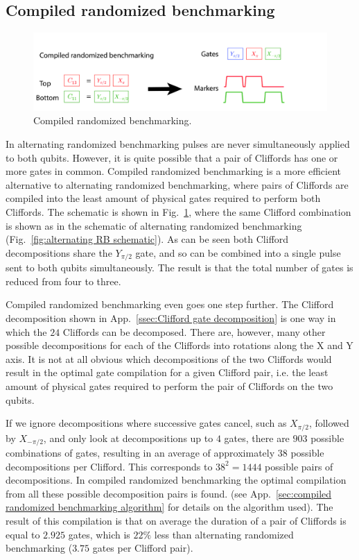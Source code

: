       \subsection{Compiled randomized benchmarking}
        \label{ssec:compiled randomized benchmarking}

        \begin{figure}[!h]
          \centering
          \includegraphics[width=\textwidth]{Figures/Randomized benchmarking/compiled RB.jpg}
          \caption{Compiled randomized benchmarking.}
          \label{fig:compiled RB schematic}
        \end{figure}

        In alternating randomized benchmarking pulses are never simultaneously applied to both qubits. However, it is quite possible that a pair of Cliffords has one or more gates in common. Compiled randomized benchmarking is a more efficient alternative to alternating randomized benchmarking, where pairs of Cliffords are compiled into the least amount of physical gates required to perform both Cliffords. The schematic is shown in Fig.~\ref{fig:compiled RB schematic}, where the same Clifford combination is shown as in the schematic of alternating randomized benchmarking (Fig.~\ref{fig:alternating RB schematic}). As can be seen both Clifford decompositions share the $Y_{\pi/2}$ gate, and so can be combined into a single pulse sent to both qubits simultaneously. The result is that the total number of gates is reduced from four to three.

        Compiled randomized benchmarking even goes one step further. The Clifford decomposition shown in App.~\ref{ssec:Clifford gate decomposition} is one way in which the $24$ Cliffords can be decomposed. There are, however, many other possible decompositions for each of the Cliffords into rotations along the X and Y axis. It is not at all obvious which decompositions of the two Cliffords would result in the optimal gate compilation for a given Clifford pair, i.e. the least amount of physical gates required to perform the pair of Cliffords on the two qubits.

        If we ignore decompositions where successive gates cancel, such as $X_{\pi/2}$, followed by $X_{-\pi/2}$, and only look at decompositions up to $4$ gates, there are $903$ possible combinations of gates, resulting in an average of approximately $38$ possible decompositions per Clifford. This corresponds to $38^2=1444$ possible pairs of decompositions. In compiled randomized benchmarking the optimal compilation from all these possible decomposition pairs is found. (see App.~\ref{sec:compiled randomized benchmarking algorithm} for details on the algorithm used). The result of this compilation is that on average the duration of a pair of Cliffords is equal to $2.925$ gates, which is $22\%$ less than alternating randomized benchmarking ($3.75$ gates per Clifford pair).

